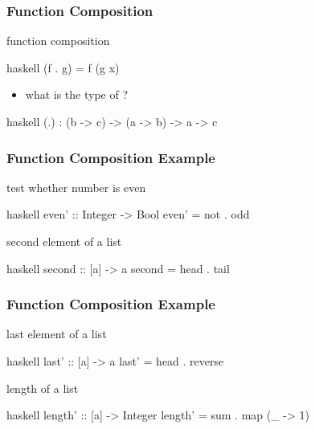 \documentclass[dvipsnames]{beamer}
\theoremstyle{plain}
\begin{document}
\begin{frame}[fragile]
  \frametitle{Function Composition}

  \begin{block}{function composition}
    \begin{pygments}{haskell}
(f . g) = f (g x)
    \end{pygments}
  \end{block}

  \pause
  \begin{itemize}
    \item what is the type of ?
  \end{itemize}

  \begin{exampleblock}{}
    \begin{pygments}{haskell}
(.) : (b -> c) -> (a -> b) -> a -> c
    \end{pygments}
  \end{exampleblock}
\end{frame}

\begin{frame}[fragile]
  \frametitle{Function Composition Example}

  \begin{exampleblock}{test whether number is even}
    \begin{pygments}{haskell}
even' :: Integer -> Bool
even' = not . odd
    \end{pygments}
  \end{exampleblock}

  \pause
  \begin{exampleblock}{second element of a list}
    \begin{pygments}{haskell}
second :: [a] -> a
second = head . tail
    \end{pygments}
  \end{exampleblock}
\end{frame}

\begin{frame}[fragile]
  \frametitle{Function Composition Example}

  \begin{exampleblock}{last element of a list}
    \begin{pygments}{haskell}
last' :: [a] -> a
last' = head . reverse
    \end{pygments}
  \end{exampleblock}

  \pause
  \begin{exampleblock}{length of a list}
    \begin{pygments}{haskell}
length' :: [a] -> Integer
length' = sum . map (\_ -> 1)
    \end{pygments}
  \end{exampleblock}
\end{frame}
\end{document}
